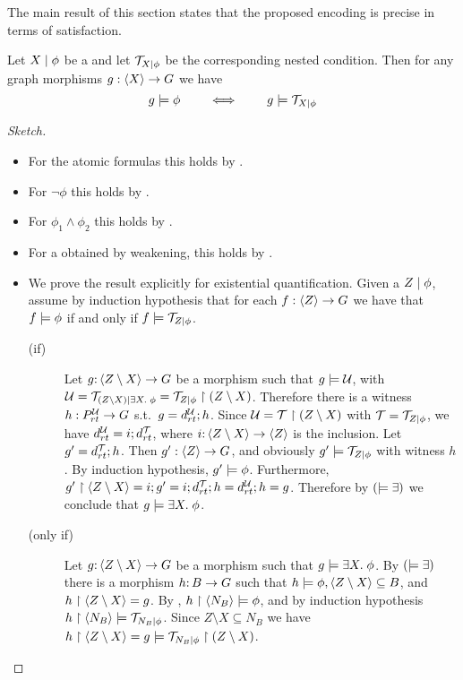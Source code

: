 The main result of this section states that the proposed encoding is precise in terms of satisfaction. 
\begin{proposition}
	Let ${X} \mid {\phi}$ be a {\cfor} and let ${\mathcal{T}}_{{X} \mid {\phi}}$ be the corresponding nested condition. Then for any graph morphisms $g: \langle X\rangle \rightarrow G$ we have
	$$ g \models \phi \qquad \iff \qquad g \models {\mathcal{T}}_{{X} \mid {\phi}} $$
\end{proposition}
\begin{proof}[Sketch]
	\begin{itemize}
	\item For the atomic formulas this holds by .
	\item For $\neg \phi$ this holds by .
	
	\item For $\phi_1 \wedge \phi_2$ this holds by .
	\item For a {\cfor} obtained by weakening, this holds by .
	\item We prove the result explicitly for existential quantification. Given a \cfor ${Z} \mid {\phi}$, assume by induction hypothesis that for each $f: \langle Z\rangle \rightarrow G$ we have that  $f \models \phi$ if and only if $f \models {\mathcal{T}}_{{Z} \mid {\phi}}$.
	\begin{description}
		\item[(if)] 
	Let $g{:}\, \langle Z\setminus X\rangle \rightarrow G$ be a morphism such that $g \models {\mathcal{U}}$, with ${\mathcal{U}} = {\mathcal{T}}_{{(Z \setminus X)} \mid {\exists X.\;\phi}} = {\mathcal{T}}_{{Z} \mid {\phi}} \restriction (Z\setminus X)$. Therefore there is a witness $h: P^{{\mathcal{U}}}_{rt} \rightarrow G$ s.t.~$g = d^{{\mathcal{U}}}_{rt}; h$. Since ${\mathcal{U}} = {\mathcal{T}} \restriction (Z\setminus X)$ with ${\mathcal{T}} = {\mathcal{T}}_{{Z} \mid {\phi}}$, we have $d^{{\mathcal{U}}}_{rt} = i; d^{{\mathcal{T}}}_{rt}$, where $i{:}\, \langle Z\setminus X\rangle \rightarrow \langle Z\rangle$ is the inclusion. Let $g' = d^{{\mathcal{T}}}_{rt}; h$. Then $g': \langle Z\rangle \rightarrow G$, and obviously $g' \models {\mathcal{T}}_{{Z} \mid {\phi}}$ with witness $h$. By induction hypothesis, $g' \models \phi$. Furthermore, $g'\restriction \langle Z\setminus X\rangle = i;g' = i;d^{{\mathcal{T}}}_{rt}; h = d^{{\mathcal{U}}}_{rt}; h = g$. Therefore by $(\models \exists)$ we conclude that $g \models \exists X.\;\phi$.   
	
	\item[(only if)] Let $g{:}\, \langle Z\setminus X\rangle \rightarrow G$ be a morphism such that $g \models \exists X.\;\phi$. By $(\models \exists)$  there is a morphism $h{:}\, B \rightarrow G$ such that $h \models \phi, \langle Z\setminus X\rangle \subseteq B$, and $h\restriction \langle Z\setminus X\rangle = g$. By ,  $h\restriction \langle N_B\rangle \models \phi$, and by induction hypothesis   $h\restriction \langle N_B\rangle \models {\mathcal{T}}_{{N_B} \mid {\phi}}$. Since  $Z \setminus X \subseteq N_B$ we have $h\restriction \langle Z \setminus X\rangle = g \models  {\mathcal{T}}_{{N_B} \mid {\phi}}\restriction (Z \setminus X)$.
\end{description}
\end{itemize}


\end{proof}

